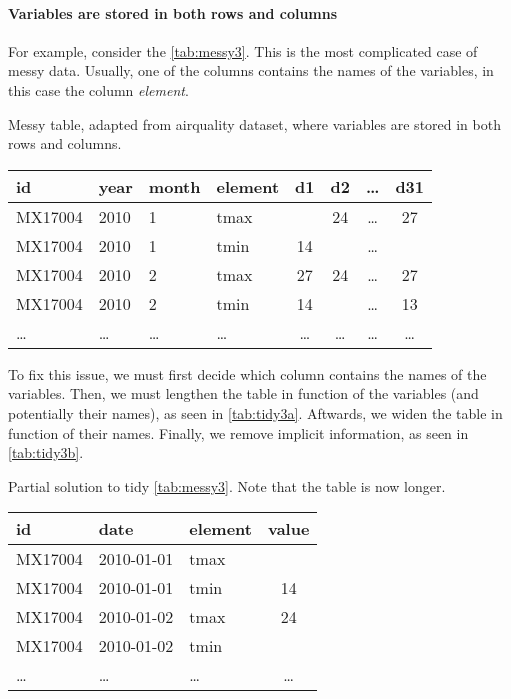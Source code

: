 \paragraph{Variables are stored in both rows and columns}  For example, consider the
\cref{tab:messy3}.  This is the most complicated case of messy data.  Usually, one of the
columns contains the names of the variables, in this case the column \emph{element}.

\begin{tablebox}[label=tab:messy3]{Messy table, adapted from airquality dataset, where variables are stored in both rows and columns.}
  \centering
  \begin{tabular}{llllcccc}
    \toprule
    id & year & month & element & d1 & d2 & \dots & d31 \\
    \midrule
    MX17004 & 2010 & 1 & tmax &    & 24 & \dots & 27 \\
    MX17004 & 2010 & 1 & tmin & 14 &    & \dots &    \\
    MX17004 & 2010 & 2 & tmax & 27 & 24 & \dots & 27 \\
    MX17004 & 2010 & 2 & tmin & 14 &    & \dots & 13 \\
    \dots & \dots & \dots & \dots & \dots & \dots & \dots & \dots \\
    \bottomrule
  \end{tabular}
\end{tablebox}

To fix this issue, we must first decide which column contains the names of the variables.
Then, we must lengthen the table in function of the variables (and potentially their
names), as seen in \cref{tab:tidy3a}.  Aftwards, we widen the table in function of their names.  Finally, we remove
implicit information, as seen in \cref{tab:tidy3b}.

\begin{tablebox}[label=tab:tidy3a]{Partial solution to tidy \cref{tab:messy3}. Note that
  the table is now longer.}
  \centering
  \begin{tabular}{lllc}
    \toprule
    id & date & element & value \\
    \midrule
    MX17004 & 2010-01-01 & tmax &    \\
    MX17004 & 2010-01-01 & tmin & 14 \\
    MX17004 & 2010-01-02 & tmax & 24 \\
    MX17004 & 2010-01-02 & tmin &    \\
    \dots & \dots & \dots & \dots \\
    \bottomrule
  \end{tabular}
\end{tablebox}

